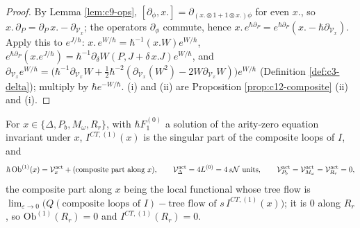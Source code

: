 \begin{proof}
By Lemma \ref{lem:c9-ops}, $[\partial_\phi,x.]=\partial_{(x.\otimes1+1\otimes x.)\phi}$ for even $x.$, so $x.\,\partial_P=\partial_P\,x.-\partial_{\mathcal V_x}$; the operators $\partial_\phi$ commute, hence $x.\,e^{\hbar\partial_P}=e^{\hbar\partial_P}(x.-\hbar\partial_{\mathcal V_x})$. Apply this to $e^{J/\hbar}$: $x.\,e^{W/\hbar}=\hbar^{-1}(x.W)e^{W/\hbar}$, $e^{\hbar\partial_P}(x.e^{J/\hbar})=\hbar^{-1}\partial_\delta W(P,J+\delta\,x.J)e^{W/\hbar}$, and $\partial_{\mathcal V_x}e^{W/\hbar}=\big(\hbar^{-1}\partial_{\mathcal V_x}W+\tfrac12\hbar^{-2}(\partial_{\mathcal V_x}(W^2)-2W\partial_{\mathcal V_x}W)\big)e^{W/\hbar}$ (Definition \ref{def:c3-delta}); multiply by $\hbar e^{-W/\hbar}$. (i) and (ii) are Proposition \ref{prop:c12-composite} (ii) and (i).
\end{proof}

\begin{lemma}
\label{lem:c12-obeven}
For $x\in\{\Delta,P_b,M_\omega,R_r\}$, with $\hbar F_1^{(0)}$ a solution of the arity-zero equation invariant under $x$, $I^{CT,(1)}(x)$ is the singular part of the composite loops of $I$, and
\begin{equation}
\hbar\,\mathrm{Ob}^{(1)}(x)=\mathcal V^{\rm act}_x+(\text{composite part along }x),\qquad \mathcal V^{\rm act}_\Delta=4L^{(0)}=4\,s\mathcal N\ \text{units},\qquad \mathcal V^{\rm act}_{P_b}=\mathcal V^{\rm act}_{M_\omega}=\mathcal V^{\rm act}_{R_r}=0,
\label{eq:c12-obeven}
\end{equation}
the composite part along $x$ being the local functional whose tree flow is $\lim_{\varepsilon\to0}\big(Q(\text{composite loops of }I)-\text{tree flow of }s\,I^{CT,(1)}(x)\big)$; it is $0$ along $R_r$, so $\mathrm{Ob}^{(1)}(R_r)=0$ and $I^{CT,(1)}(R_r)=0$.
\end{lemma}

